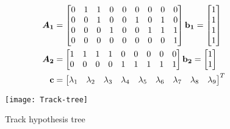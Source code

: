 \begin{equation}
\begin{split}
\bm{A_1} &=\begin{bmatrix}
		0 & 1 & 1 & 0 & 0 & 0 & 0 & 0 & 0 \\
       	0 & 0 & 1 & 0 & 0 & 1 & 0 & 1 & 0 \\
       	0 & 0 & 0 & 1 & 0 & 0 & 1 & 1 & 1 \\
       	0 & 0 & 0 & 0 & 0 & 0 & 0 & 0 & 1 \\
     	\end{bmatrix}
\boldsymbol{\mathbf{b_1}} = 	\begin{bmatrix}
			1 \\ 1  \\ 1 \\ 1
			\end{bmatrix} \\
\bm{A_2} &=\begin{bmatrix}
		1 & 1 & 1 & 1 & 0 & 0 & 0 & 0 & 0 \\
       	0 & 0 & 0 & 0 & 1 & 1 & 1 & 1 & 1 \\
     	\end{bmatrix} 
\boldsymbol{\mathbf{b_2}} = 	\begin{bmatrix}
			1 \\ 1
			\end{bmatrix} \\
\boldsymbol{\mathbf{c}} &=\begin{bmatrix}
		\lambda_1 & \lambda_2 & \lambda_3 & \lambda_4 & \lambda_5 & \lambda_6 & \lambda_7 & \lambda_8 & \lambda_9
		\end{bmatrix}^T \\
\end{split}
\end{equation}

\begin{figure}
\centering
\texttt{[image: Track-tree]}
\caption{Track hypothesis tree}
\label{fig:hyp-tree}
\end{figure}

